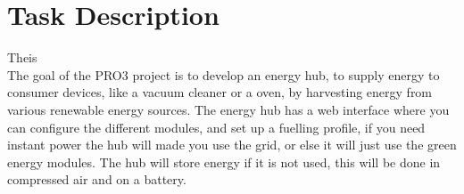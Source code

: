 \section{Task Description}Theis\\
The goal of the PRO3 project is to develop an energy hub, to supply energy to consumer devices, like a vacuum cleaner or a oven, by harvesting energy from various renewable energy sources. The energy hub has a web interface where you can configure the different modules, and set up a fuelling profile, if you need instant power the hub will made you use the grid, or else it will just use the green energy modules. The hub will store energy if it is not used, this will be done in compressed air and on a battery.